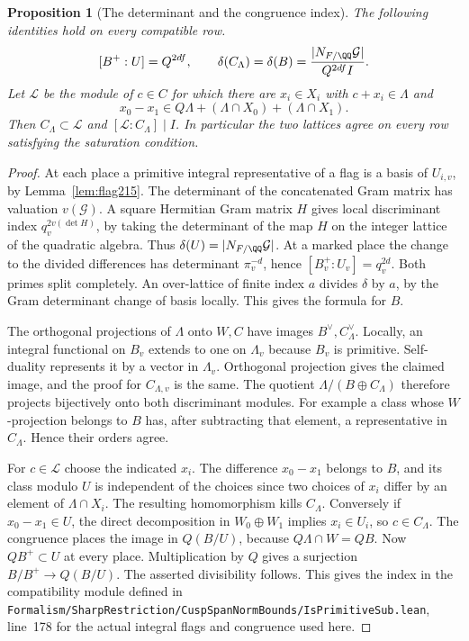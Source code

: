 \documentclass[a4paper,11pt]{article}
\newtheorem{proposition}{Proposition}[section]
\theoremstyle{definition}
\theoremstyle{remark}
\newcommand{\srcloc}[2]{{\small\nolinkurl{#1.lean}}, line~#2}
\numberwithin{equation}{section}
\begin{document}
\begin{proposition}[The determinant and the congruence index]\label{prop:index219}
The following identities hold on every compatible row.
\[
 [B^+:U]=Q^{2df},\qquad
 \delta(C_\Lambda)=\delta(B)
    =\frac{|N_{F/\QQ}\mathcal G|}{Q^{2df}I}.
\]
Let \(\mathcal L\) be the module of \(c\in C\) for which there
are \(x_i\in X_i\) with \(c+x_i\in\Lambda\) and
\[
 x_0-x_1\in Q\Lambda+(\Lambda\cap X_0)+(\Lambda\cap X_1).
\]
Then \(C_\Lambda\subset\mathcal L\) and
\([\mathcal L:C_\Lambda]\mid I\). In particular the two
lattices agree on every row satisfying the saturation condition.
\end{proposition}
\begin{proof}
At each place a primitive integral representative of a flag is
a basis of \(U_{i,v}\), by Lemma~\ref{lem:flag215}. The
determinant of the concatenated Gram matrix has valuation
\(v(\mathcal G)\). A square Hermitian Gram matrix \(H\) gives
local discriminant index \(q_v^{2v(\det H)}\), by taking the
determinant of the map \(H\) on the integer lattice of the
quadratic algebra. Thus \(\delta(U)=|N_{F/\QQ}\mathcal G|\).
At a marked place the change to the divided differences has
determinant \(\pi_v^{-d}\), hence
\([B_v^+:U_v]=q_v^{2d}\). Both primes split completely.
An over-lattice of finite index \(a\) divides \(\delta\) by
\(a\), by the Gram determinant change of basis locally.
This gives the formula for \(B\).

The orthogonal projections of \(\Lambda\) onto \(W,C\) have
images \(B^\vee,C_\Lambda^\vee\). Locally, an integral
functional on \(B_v\) extends to one on \(\Lambda_v\) because
\(B_v\) is primitive. Self-duality represents it by a vector
in \(\Lambda_v\). Orthogonal projection gives the claimed image,
and the proof for \(C_{\Lambda,v}\) is the same. The quotient
\(\Lambda/(B\oplus C_\Lambda)\) therefore projects bijectively
onto both discriminant modules. For example a class whose
\(W\)-projection belongs to \(B\) has, after subtracting that
element, a representative in \(C_\Lambda\). Hence their orders
agree.

For \(c\in\mathcal L\) choose the indicated \(x_i\).
The difference \(x_0-x_1\) belongs to \(B\), and its class
modulo \(U\) is independent of the choices since two choices
of \(x_i\) differ by an element of \(\Lambda\cap X_i\).
The resulting homomorphism kills \(C_\Lambda\). Conversely if
\(x_0-x_1\in U\), the direct decomposition in \(W_0\oplus W_1\)
implies \(x_i\in U_i\), so \(c\in C_\Lambda\). The congruence
places the image in \(Q(B/U)\), because \(Q\Lambda\cap W=QB\).
Now \(QB^+\subset U\) at every place. Multiplication by \(Q\)
gives a surjection \(B/B^+\to Q(B/U)\). The asserted divisibility
follows. This gives the index in the compatibility module defined
in \srcloc{Formalism/SharpRestriction/CuspSpanNormBounds/IsPrimitiveSub}{178}
for the actual integral flags and congruence used here.
\end{proof}
\end{document}
